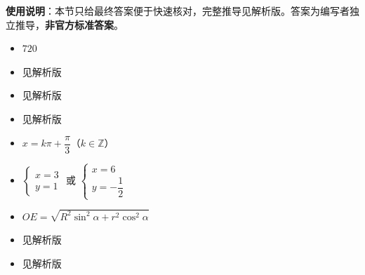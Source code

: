 
\begin{gknotice}
\textbf{使用说明}：本节只给最终答案便于快速核对，完整推导见解析版。答案为编写者独立推导，\textbf{非官方标准答案}。
\end{gknotice}

\begin{itemize}[leftmargin=2.6em]
  \item[\textbf{1.}] $720$
  \item[\textbf{2.}] 见解析版
  \item[\textbf{3.}] 见解析版
  \item[\textbf{4.}] 见解析版
  \item[\textbf{5.}] $x=k\pi+\dfrac\pi3$（$k\in\mathbb Z$）
  \item[\textbf{6.}] $\begin{cases}x=3\\y=1\end{cases}$ 或 $\begin{cases}x=6\\y=-\dfrac12\end{cases}$
  \item[\textbf{7.}] $OE=\sqrt{R^2\sin^2\alpha+r^2\cos^2\alpha}$
  \item[\textbf{8.}] 见解析版
  \item[\textbf{9.}] 见解析版
\end{itemize}
